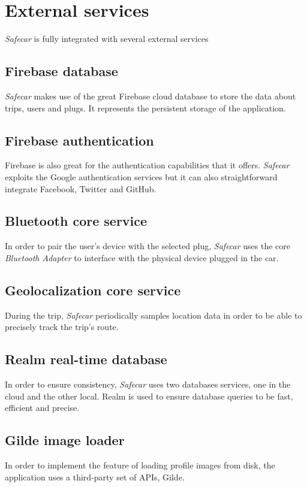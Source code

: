 \section{External services}
\textit{Safecar} is fully integrated with several external services

\subsection{Firebase database}
\textit{Safecar} makes use of the great Firebase cloud database to store the data about trips, users and plugs. It represents the persistent storage of the application.

\subsection{Firebase authentication}
Firebase is also great for the authentication capabilities that it offers. \textit{Safecar} exploits the Google authentication services but it can also straightforward integrate Facebook, Twitter and GitHub.

\subsection{Bluetooth core service}
In order to pair the user's device with the selected plug, \textit{Safecar} uses the core \textit{Bluetooth Adapter} to interface with the physical device plugged in the car.

\subsection{Geolocalization core service}
During the trip, \textit{Safecar} periodically samples location data in order to be able to precisely track the trip's route.

\subsection{Realm real-time database}
In order to ensure consistency, \textit{Safecar} uses two databases services, one in the cloud and the other local. Realm is used to ensure database queries to be fast, efficient and precise.

\subsection{Gilde image loader}
In order to implement the feature of loading profile images from disk, the application uses a third-party set of APIs, Gilde.

